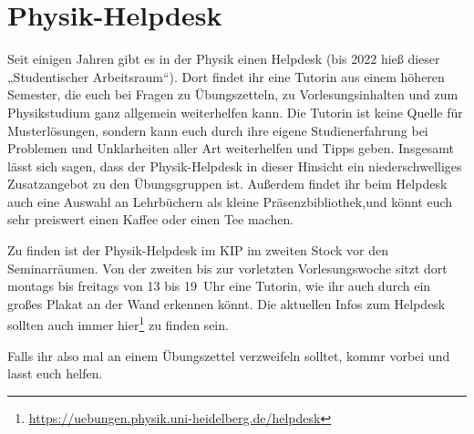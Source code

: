 \section{Physik-Helpdesk}
\label{sec:physik-helpdesk}

Seit einigen Jahren gibt es in der Physik einen Helpdesk (bis 2022 hieß dieser „Studentischer Arbeitsraum“). Dort findet ihr eine Tutorin aus einem höheren Semester, die euch bei Fragen zu Übungszetteln, zu Vorlesungsinhalten und zum Physikstudium ganz allgemein weiterhelfen kann. Die Tutorin ist keine Quelle für Musterlösungen, sondern kann euch durch ihre eigene Studienerfahrung bei Problemen und Unklarheiten aller Art weiterhelfen und Tipps geben. Insgesamt lässt sich sagen, dass der Physik-Helpdesk in dieser Hinsicht ein niederschwelliges Zusatzangebot zu den Übungsgruppen ist. Außerdem findet ihr beim Helpdesk auch eine Auswahl an Lehrbüchern als kleine Präsenzbibliothek,und könnt euch sehr preiswert einen Kaffee oder einen Tee machen.

Zu finden ist der Physik-Helpdesk im \gls{KIP} im zweiten Stock vor den Seminarräumen. Von der zweiten bis zur vorletzten Vorlesungswoche sitzt dort montags bis freitags von 13 bis 19~Uhr eine Tutorin, wie ihr auch durch ein großes Plakat an der Wand erkennen könnt. Die aktuellen Infos zum Helpdesk sollten auch immer hier\footnote{\url{https://uebungen.physik.uni-heidelberg.de/helpdesk}} zu finden sein.

Falls ihr also mal an einem Übungszettel verzweifeln solltet, kommr vorbei und lasst euch helfen.
